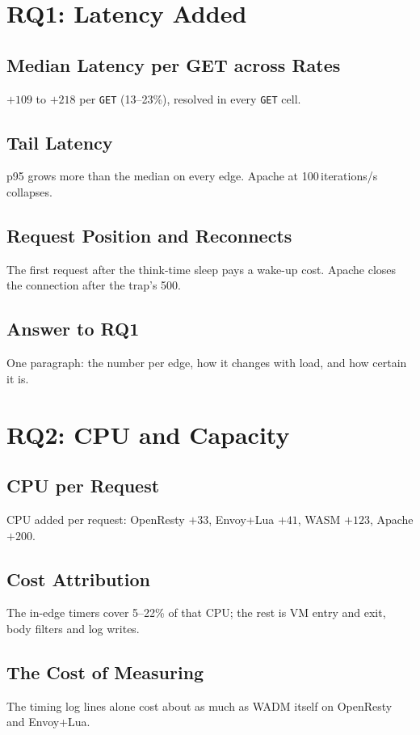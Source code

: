 \documentclass{rptuma}
\begin{document}
\section{RQ1: Latency Added}
\subsection{Median Latency per GET across Rates}
$+109$ to $+218$\us{} per \texttt{GET} (13--23\%), resolved in every \texttt{GET} cell.
\subsection{Tail Latency}
p95 grows more than the median on every edge. Apache at 100\,iterations/s collapses.
\subsection{Request Position and Reconnects}
The first request after the think-time sleep pays a wake-up cost. Apache closes the connection
after the trap's 500.
\subsection{Answer to RQ1}
One paragraph: the number per edge, how it changes with load, and how certain it is.

\section{RQ2: CPU and Capacity}
\subsection{CPU per Request}
CPU added per request: OpenResty $+33$, Envoy+Lua $+41$, WASM $+123$, Apache $+200$\us.
\subsection{Cost Attribution}
The in-edge timers cover 5--22\% of that CPU; the rest is VM entry and exit, body filters and log
writes.
\subsection{The Cost of Measuring}
The timing log lines alone cost about as much as WADM itself on OpenResty and Envoy+Lua.
\end{document}
